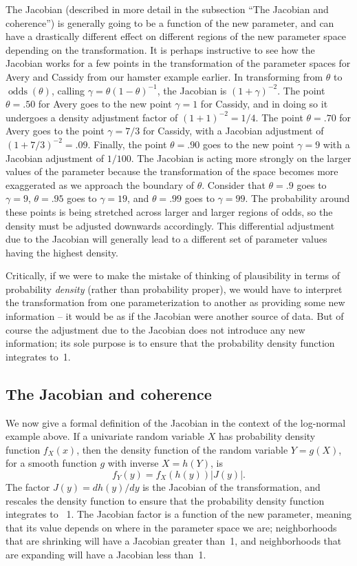\documentclass[9pt,twocolumn,twoside]{cidlab-draft}\templatetype{cidlab-invited}
\DeclareMathOperator*{\oddss}{odds}
\begin{document}
The Jacobian (described in more detail in the subsection ``The Jacobian and coherence'') is generally going to be a function of the new parameter, and can have a drastically different effect on different regions of the new parameter space depending on the transformation. It is perhaps instructive to see how the Jacobian works for a few points in the transformation of the parameter spaces for Avery and Cassidy from our hamster example earlier. In transforming from $\theta$ to $\oddss(\theta)$, calling $\gamma={\theta}(1-\theta)^{-1}$, the Jacobian is $(1+\gamma)^{-2}$. The point $\theta=.50$ for Avery goes to the new point $\gamma=1$ for Cassidy, and in doing so it undergoes a density adjustment factor of $(1+1)^{-2} = 1/4$. The point $\theta=.70$ for Avery goes to the point $\gamma=7/3$ for Cassidy, with a Jacobian adjustment of $(1+7/3)^{-2}=.09$. Finally, the point $\theta=.90$ goes to the new point $\gamma=9$ with a Jacobian adjustment of $1/100$.  The Jacobian is acting more strongly on the larger values of the parameter because the transformation of the space becomes more exaggerated as we approach the boundary of $\theta$. Consider that $\theta=.9$ goes to $\gamma=9$, $\theta=.95$ goes to $\gamma=19$, and $\theta=.99$ goes to $\gamma=99$. The probability around these points is being stretched across larger and larger regions of odds, so the density must be adjusted downwards accordingly. This differential adjustment due to the Jacobian will generally lead to a different set of parameter values having the highest density.

Critically, if we were to make the mistake of thinking of plausibility in terms of probability \textit{density} (rather than probability proper), we would have to interpret the transformation from one parameterization to another as providing some new information -- it would be as if the Jacobian were another source of data.  But of course the adjustment due to the Jacobian does not introduce any new information; its sole purpose is to ensure that the probability density function integrates to~1. 

\subsection{The Jacobian and coherence} \label{subsection:jacobian}
We now give a formal definition of the Jacobian in the context of the log-normal example above. If a univariate random variable $X$ has probability density function $f_X(x)$, then the density function of the random variable $Y=g(X)$, for a smooth function $g$ with inverse $X = h(Y)$, is 
\begin{equation}\label{eq:jacobian}
f_Y(y) = f_X(h(y))  \left|J(y)\right|.
\end{equation}
The factor $J(y) = dh(y)/dy$ is the Jacobian of the transformation, and rescales the density function to ensure that the probability density function integrates to ~1. The Jacobian factor is a function of the new parameter, meaning that its value depends on where in the parameter space we are; neighborhoods that are shrinking will have a Jacobian greater than~1, and neighborhoods that are expanding will have a Jacobian less than~1.
\end{document}
